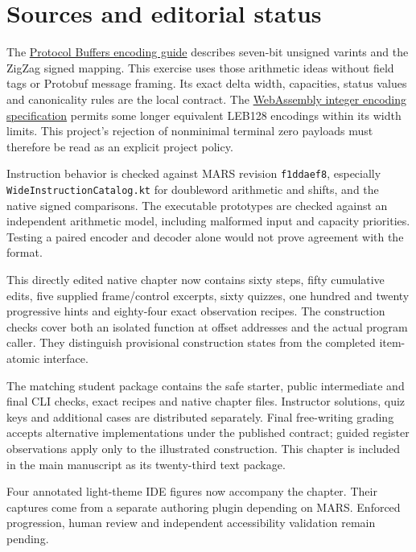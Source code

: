 \section*{Sources and editorial status}
The \href{https://protobuf.dev/programming-guides/encoding/}{Protocol Buffers encoding
guide} describes seven-bit unsigned varints and the ZigZag signed mapping. This exercise
uses those arithmetic ideas without field tags or Protobuf message framing. Its exact
delta width, capacities, status values and canonicality rules are the local contract.
The \href{https://webassembly.github.io/spec/core/binary/values.html\#integers}{WebAssembly
integer encoding specification} permits some longer equivalent LEB128 encodings within
its width limits. This project's rejection of nonminimal terminal zero payloads must
therefore be read as an explicit project policy.

Instruction behavior is checked against MARS revision \texttt{f1ddaef8}, especially
\texttt{WideInstructionCatalog.kt} for doubleword arithmetic and shifts, and the native
signed comparisons. The executable prototypes are checked against an independent
arithmetic model, including malformed input and capacity priorities. Testing a paired
encoder and decoder alone would not prove agreement with the format.

This directly edited native chapter now contains sixty steps, fifty cumulative edits,
five supplied frame/control excerpts, sixty quizzes, one hundred and twenty progressive
hints and eighty-four exact observation recipes. The construction checks cover both an
isolated function at offset addresses and the actual program caller. They distinguish
provisional construction states from the completed item-atomic interface.

The matching student package contains the safe starter, public intermediate and final
CLI checks, exact recipes and native chapter files. Instructor solutions, quiz keys and
additional cases are distributed separately. Final free-writing grading accepts
alternative implementations under the published contract; guided register observations
apply only to the illustrated construction. This chapter is included in the main
manuscript as its twenty-third text package.

Four annotated light-theme IDE figures now accompany the chapter. Their captures
come from a separate authoring plugin depending on MARS. Enforced progression, human
review and independent accessibility validation remain pending.
